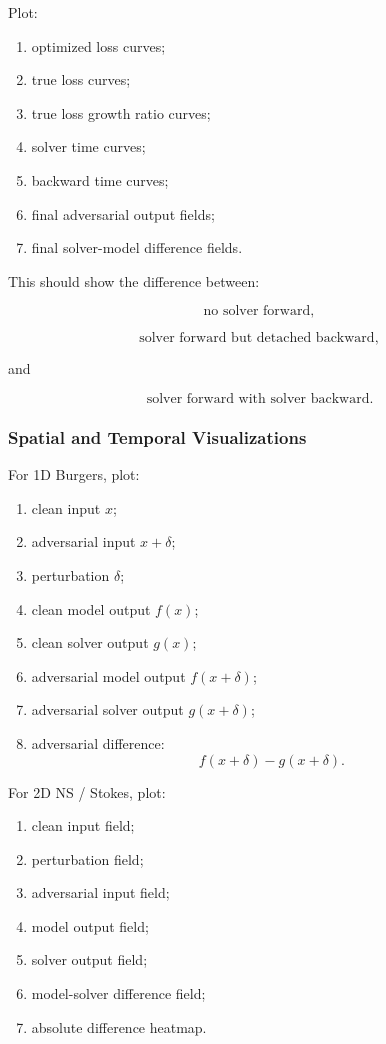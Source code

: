 \documentclass{article}
\begin{document}
Plot:

\begin{enumerate}
    \item optimized loss curves;
    \item true loss curves;
    \item true loss growth ratio curves;
    \item solver time curves;
    \item backward time curves;
    \item final adversarial output fields;
    \item final solver-model difference fields.
\end{enumerate}

This should show the difference between:

\[
\text{no solver forward},
\]

\[
\text{solver forward but detached backward},
\]

and

\[
\text{solver forward with solver backward}.
\]

\subsubsection{Spatial and Temporal Visualizations}

For 1D Burgers, plot:

\begin{enumerate}
    \item clean input \(x\);
    \item adversarial input \(x+\delta\);
    \item perturbation \(\delta\);
    \item clean model output \(f(x)\);
    \item clean solver output \(g(x)\);
    \item adversarial model output \(f(x+\delta)\);
    \item adversarial solver output \(g(x+\delta)\);
    \item adversarial difference:
    \[
    f(x+\delta)-g(x+\delta).
    \]
\end{enumerate}

For 2D NS / Stokes, plot:

\begin{enumerate}
    \item clean input field;
    \item perturbation field;
    \item adversarial input field;
    \item model output field;
    \item solver output field;
    \item model-solver difference field;
    \item absolute difference heatmap.
\end{enumerate}
\end{document}
